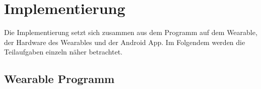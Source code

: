 \chapter{Implementierung}
\label{ch:implementation}
Die Implementierung setzt sich zusammen aus dem Programm auf dem Wearable, der Hardware des Wearables und der Android App. Im Folgendem werden die Teilaufgaben einzeln näher betrachtet.

\section{Wearable Programm}
